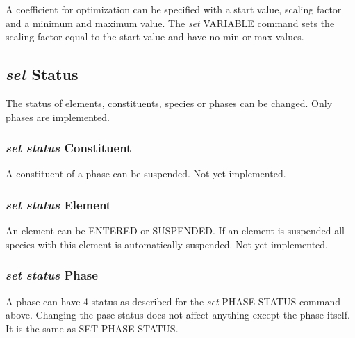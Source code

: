 \documentclass[12pt]{article}
\begin{document}
A coefficient for optimization can be specified with a start value,
scaling factor and a minimum and maximum value.  The {\em set} VARIABLE
command sets the scaling factor equal to the start value and have no
min or max values.

\subsection{{\em set} Status}

The status of elements, constituents, species or phases can be
changed.  Only phases are implemented.

\subsubsection{{\em set status} Constituent}

A constituent of a phase can be suspended.  Not yet implemented.

\subsubsection{{\em set status} Element}

An element can be ENTERED or SUSPENDED.  If an element is suspended
all species with this element is automatically suspended.  Not yet
implemented.

\subsubsection{{\em set status} Phase}

A phase can have 4 status as described for the {\em set} PHASE STATUS
command above.  Changing the pase status does not affect anything
except the phase itself.  It is the same as SET PHASE STATUS.
\end{document}
